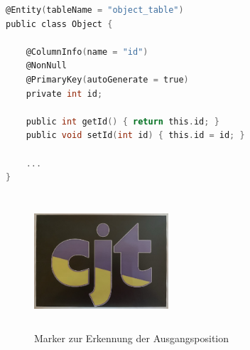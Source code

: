 \begin{lstlisting}[language=C,
    frame=single,           % Ein Rahmen um den Code
    framexleftmargin=-1pt,  % Rahmen link von den Zahlen
    style=algoBericht,
    label={code:entity},
    captionpos=b,           % Caption unter den Code setzen
caption={Entity Code zur Initialisierung der Objekte}]
@Entity(tableName = "object_table")
public class Object {

    @ColumnInfo(name = "id")
    @NonNull
    @PrimaryKey(autoGenerate = true)
    private int id;

    public int getId() { return this.id; }
    public void setId(int id) { this.id = id; }

    ... 
}
\end{lstlisting}

\begin{figure}[hbt!]
    \centering
    \includegraphics[width=5cm,height=5cm,keepaspectratio]{4Umsetzung/Bilder/cjt_logo_tracking.png}
    \caption{Marker zur Erkennung der Ausgangsposition}
    \label{pic:initialMarker}
\end{figure}
